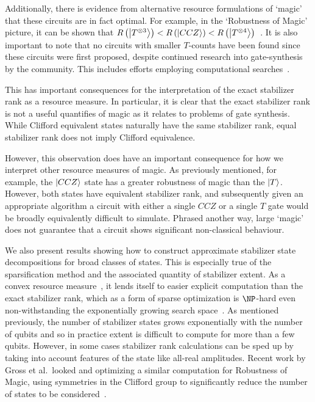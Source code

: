 Additionally, there is evidence from alternative resource formulations of `magic' that these circuits are in fact optimal. For example, in the `Robustness of Magic' picture, it can be shown that $R\left(\ket{T^{\otimes 3}}\right)<R\left(\ket{CCZ}\right)<R\left(\ket{T^{\otimes 4}}\right)$~\cite{Howard2017}. It is also important to note that no circuits with smaller $T$-counts have been found since these circuits were first proposed, despite continued research into gate-synthesis by the community. This includes efforts employing computational searches~\cite{Heyfron2018}.\par
This has important consequences for the interpretation of the exact stabilizer rank as a resource measure. In particular, it is clear that the exact stabilizer rank is not a useful quantifies of magic as it relates to problems of gate synthesis. While Clifford equivalent states naturally have the same stabilizer rank, equal stabilizer rank does not imply Clifford equivalence.\par
However, this observation does have an important consequence for how we interpret other resource measures of magic. As previously mentioned, for example, the $\ket{CCZ}$ state has a greater robustness of magic than the $\ket{T}$. However, both states have equivalent stabilizer rank, and subsequently given an appropriate algorithm a circuit with either a single $CCZ$ or a single $T$ gate would be broadly equivalently difficult to simulate. Phrased another way, large `magic' does not guarantee that a circuit shows significant non-classical behaviour.\par
We also present results showing how to construct approximate stabilizer state decompositions for broad classes of states. This is especially true of the sparsification method and the associated quantity of stabilizer extent. As a convex resource measure~\cite{Regula2018}, it lends itself to easier explicit computation than the exact stabilizer rank, which as a form of sparse optimization is $\NP$-hard even non-withstanding the exponentially growing search space~\cite{Natarajan1995}. As mentioned previously, the number of stabilizer states grows exponentially with the number of qubits and so in practice extent is difficult to compute for more than a few qubits. However, in some cases stabilizer rank calculations can be sped up by taking into account features of the state like all-real amplitudes. Recent work by Gross et al.\ looked and optimizing a similar computation for Robustness of Magic, using symmetries in the Clifford group to significantly reduce the number of states to be considered~\cite{Gross2017}.\par
